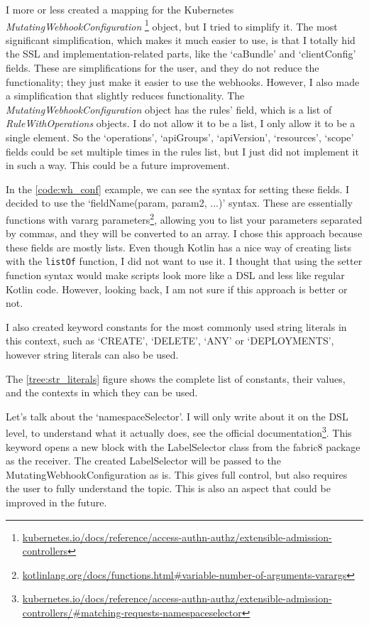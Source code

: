 I more or less created a mapping for the Kubernetes \emph{MutatingWebhookConfiguration}
\footnote{\url{kubernetes.io/docs/reference/access-authn-authz/extensible-admission-controllers}}
object, but I tried to simplify it. The most significant simplification, which makes it much easier to use, is that I totally hid the SSL and implementation-related parts, like the `caBundle' and `clientConfig' fields. These are simplifications for the user, and they do not reduce the functionality; they just make it easier to use the webhooks. However, I also made a simplification that slightly reduces functionality. The \emph{MutatingWebhookConfiguration} object has the rules' field, which is a list of \emph{RuleWithOperations} objects. I do not allow it to be a list, I only allow it to be a single element. So the `operations', `apiGroups', `apiVersion', `resources', `scope' fields could be set multiple times in the rules list, but I just did not implement it in such a way. This could be a future improvement.

In the \ref{code:wh_conf} example, we can see the syntax for setting these fields. I decided to use the `fieldName(param, param2, ...)' syntax. These are essentially functions with vararg parameters\footnote{\url{kotlinlang.org/docs/functions.html\#variable-number-of-arguments-varargs}}, allowing you to list your parameters separated by commas, and they will be converted to an array. I chose this approach because these fields are mostly lists. Even though Kotlin has a nice way of creating lists with the \lstinline|listOf| function, I did not want to use it. I thought that using the setter function syntax would make scripts look more like a DSL and less like regular Kotlin code. However, looking back, I am not sure if this approach is better or not.

I also created keyword constants for the most commonly used string literals in this context, such as `CREATE', `DELETE', `ANY' or `DEPLOYMENTS', however string literals can also be used.

The \ref{tree:str_literals} figure shows the complete list of constants, their values, and the contexts in which they can be used.



Let's talk about the `namespaceSelector'. I will only write about it on the DSL level, to understand what it actually does, see the official documentation\footnote{\url{kubernetes.io/docs/reference/access-authn-authz/extensible-admission-controllers/\#matching-requests-namespaceselector}}. 
This keyword opens a new block with the LabelSelector class from the fabric8 package as the receiver. The created LabelSelector will be passed to the MutatingWebhookConfiguration as is. This gives full control, but also requires the user to fully understand the topic. This is also an aspect that could be improved in the future.

